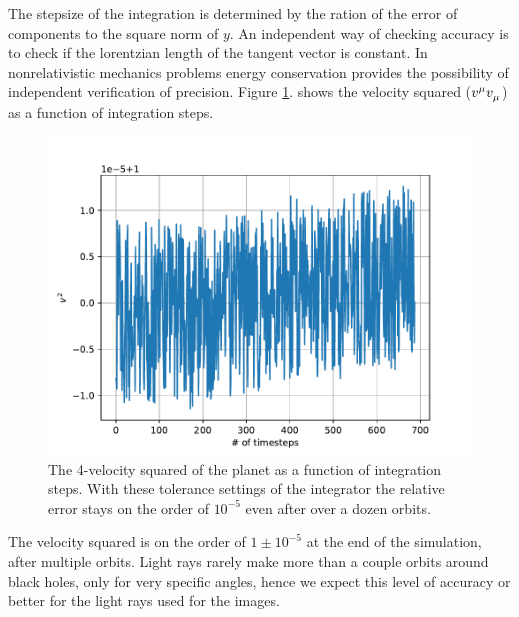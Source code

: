 \documentclass[pdftex,12pt,a4paper]{article}
\begin{document}
		The stepsize of the integration is determined by the ration of the error of components to the square norm of $y$. An independent way of checking accuracy is to check if the lorentzian length of the tangent vector is constant. In nonrelativistic mechanics problems energy conservation provides the possibility of independent verification of precision. Figure \ref{error}. shows the velocity squared ($\tensor{v}{^\mu}\tensor{v}{_\mu}$) as a function of integration steps.
		\begin{figure}[H]
			\centering
			\includegraphics[scale=1]{./figs/planetError.pdf}
			\caption{The 4-velocity squared of the planet as a function of integration steps. With these tolerance settings of the integrator the relative error stays on the order of $10^{-5}$ even after over a dozen orbits.}
			\label{error}
		\end{figure}
		The velocity squared is on the order of $1\pm10^{-5}$ at the end of the simulation, after multiple orbits. Light rays rarely make more than a couple orbits around black holes, only for very specific angles, hence we expect this level of accuracy or better for the light rays used for the images.
		
\end{document}
